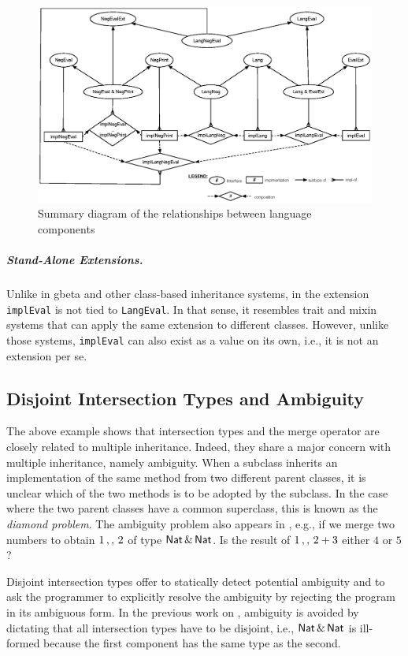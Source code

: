 \begin{figure}[t]
  \centering
\includegraphics[scale=0.75]{diagram.eps}
\caption{Summary diagram of the relationships between language components}
\label{fig:diagram}
\end{figure}


\subparagraph{Stand-Alone Extensions.}
Unlike in gbeta and other class-based inheritance systems, in \name
the extension \lstinline{implEval} is not tied to \lstinline{LangEval}. In that
sense, it resembles trait and mixin systems that can apply the same extension
to different classes. However, unlike those systems, \lstinline{implEval} can also
exist as a value on its own, i.e., it is not an extension per se.

\subsection{Disjoint Intersection Types and Ambiguity}

The above example shows that intersection types and the merge operator
are closely related to multiple
inheritance. Indeed, they share a major concern with multiple inheritance,
namely ambiguity. When a subclass inherits an implementation of the same
method from two different parent classes, it is unclear which of the two
methods is to be adopted by the subclass. In the case where the two parent classes
have a common superclass, this is known as the \emph{diamond problem}.
The ambiguity problem also appears in \name,
e.g., if we merge two numbers to obtain $1 \, ,, \, 2$ of type
$\mathsf{Nat} \,\&\, \mathsf{Nat}$. Is the result of $1 \, ,, \, 2 + 3$
either $4$ or $5$?

Disjoint intersection types offer to statically detect potential ambiguity and
to ask the programmer to explicitly resolve the ambiguity by rejecting the
program in its ambiguous form. In the previous work on \oname, ambiguity is
avoided by dictating that all intersection types have to be disjoint, i.e.,
$\mathsf{Nat} \,\&\, \mathsf{Nat}$ is ill-formed because the first component
has the same type as the second.

